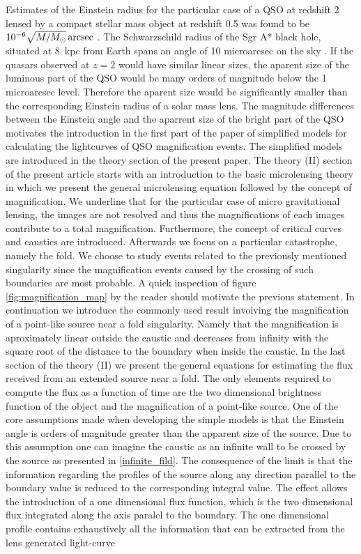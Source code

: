 Estimates of the Einstein radius for the particular case of a QSO at redshift 2 lensed by a compact stellar mass object at redshift 0.5 was found to be $10^{-6} \sqrt{M/M_\odot}\rm\,arcsec$ \citep{2001PASA...18..207W}. The Schwarzschild radius of the Sgr A* black hole, situated at 8~kpc from Earth \citep{1993ARA&A..31..345R} spans an angle of 10 microarcsec on the sky \citep{2008JPhCS.131a2055D}. If the quasars observed at $z=2$ would have similar linear sizes, the aparent size of the luminous part of the QSO would be many orders of magnitude below the 1 microarcsec level. Therefore the aparent size would be significantly smaller than the corresponding Einstein radius of a solar mass lens. 
The magnitude differences between the Einstein angle and the aparrent size of the bright part of the QSO motivates the introduction in the first part of the paper of simplified models for     
calculating the lightcurves of QSO magnification events. The simplified models are introduced in the theory section of the present paper. The theory (II) section of the present article starts with an introduction to the basic microlensing theory in which we present the general microlensing equation followed by the concept of magnification. We underline that for the particular case of micro gravitational lensing,
the images are not resolved and thus the magnifications of each images contribute to a total magnification. 
Furthermore, the concept of critical curves and caustics are introduced. Afterwards we focus on a particular catastrophe, namely the fold. 
We choose to study events related to the previously mentioned singularity since the magnification events caused by the crossing of such boundaries are most probable. A quick inspection of figure \ref{fig:magnification_map} by the reader should motivate the previous statement. 
In continuation we introduce the commonly used result involving the magnification of a point-like source near a fold singularity. 
Namely that the magnification is aproximately linear outside the caustic and decreases from infinity with the square root of the distance to the boundary when inside the caustic.  
In the last section of the theory (II) we present the general equations for estimating the flux received from an extended source near a fold. 
The only elements required to compute the flux as a function of time are the two dimensional brightness function of the object and the magnification of a point-like source. 
One of the core assumptions made when developing the simple models is that the Einstein angle is orders of magnitude greater than the apparent size of the source. 
Due to this assumption one can imagine the caustic as an infinite wall to be crossed by the source as presented in \ref{infinite_fild}. 
The consequence of the limit is that the information regarding the profiles of the source along any direction parallel to the boundary value is reduced to the corresponding integral value. 
The effect allows the introduction of a one dimensional flux function, which is the two dimensional flux integrated along the axis paralel to the boundary. 
The one dimensional profile contains exhaustively all the information that can be extracted  from the lens generated light-curve \\


